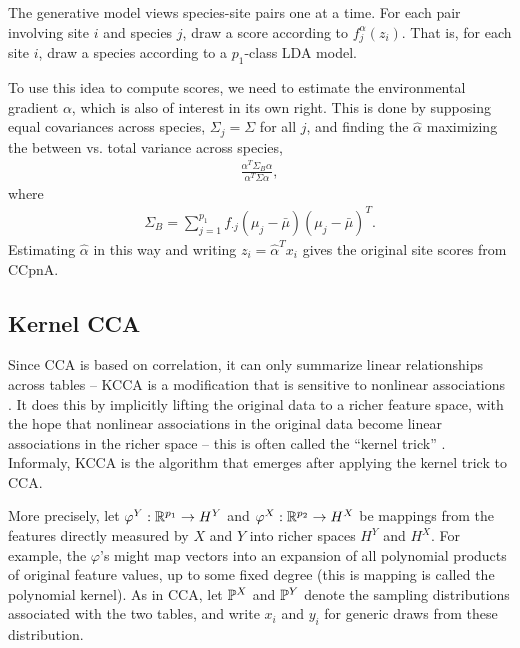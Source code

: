 \documentclass{article}
\begin{document}
The generative model views species-site pairs one at a time. For each pair
involving site $i$ and species $j$, draw a score according to
$f_{j}^{\alpha}\left(z_{i}\right)$. That is, for each site $i$, draw a species
according to a $p_{1}$-class LDA model.

To use this idea to compute scores, we need to estimate the environmental
gradient $\alpha$, which is also of interest in its own right. This is done by
supposing equal covariances across species, $\Sigma_{j} = \Sigma$ for all $j$,
and finding the $\hat{\alpha}$ maximizing the between vs. total variance across
species,
\begin{align*}
  \frac{\alpha^{T} \Sigma_{B} \alpha}{\alpha^{T} \Sigma \alpha},
\end{align*}
where
\begin{align*}
  \Sigma_{B} = \sum_{j = 1}^{p_{1}} f_{\cdot j}\left(\mu_{j} -
    \bar{\mu}\right)\left(\mu_{j} - \bar{\mu}\right)^{T}.
\end{align*}
Estimating $\hat{\alpha}$ in this way and writing $z_{i} =
\hat{\alpha}^{T}x_{i}$ gives the original site scores from CCpnA.

\subsection{Kernel CCA}
\label{subsec:kernel_cca}

Since CCA is based on correlation, it can only summarize linear relationships
across tables -- KCCA is a modification that is sensitive to nonlinear
associations \citep{akaho2006kernel, bach2003kernel, lanckriet2004statistical}.
It does this by implicitly lifting the original data to a richer feature space,
with the hope that nonlinear associations in the original data become linear
associations in the richer space -- this is often called the ``kernel trick''
\citep{scholkopf2001kernel}. Informaly, KCCA is the algorithm that emerges after
applying the kernel trick to CCA.

More precisely, let $\varphi^{Y}: \reals^{p_{1}} \to H^{Y}$ and $\varphi^{X}:
\reals^{p_{2}} \to H^{X}$ be mappings from the features directly measured by $X$
and $Y$ into richer spaces $H^{Y}$ and $H^{X}$. For example, the $\varphi$'s
might map vectors into an expansion of all polynomial products of original
feature values, up to some fixed degree (this is mapping is called the
polynomial kernel). As in CCA, let $\P^{X}$ and $\P^{Y}$ denote the sampling
distributions associated with the two tables, and write $x_{i}$ and $y_{i}$ for
generic draws from these distribution.
\end{document}
